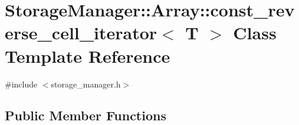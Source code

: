 \hypertarget{classStorageManager_1_1Array_1_1const__reverse__cell__iterator}{}\section{Storage\+Manager\+:\+:Array\+:\+:const\+\_\+reverse\+\_\+cell\+\_\+iterator$<$ T $>$ Class Template Reference}
\label{classStorageManager_1_1Array_1_1const__reverse__cell__iterator}


{\ttfamily \#include $<$storage\+\_\+manager.\+h$>$}

\subsection*{Public Member Functions}
